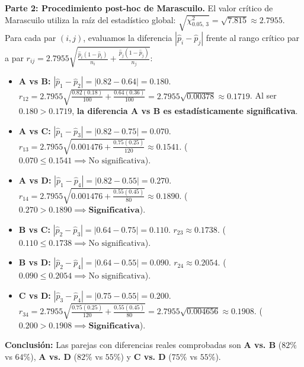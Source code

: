 \begin{solproblema}
	\textbf{Parte 2: Procedimiento post-hoc de Marascuilo.}
	El valor crítico de Marascuilo utiliza la raíz del estadístico global: $\sqrt{\chi^2_{0.05, \, 3}} = \sqrt{7.815} \approx 2.7955$.
	Para cada par $(i, j)$, evaluamos la diferencia $|\hat{p}_i - \hat{p}_j|$ frente al rango crítico par a par $r_{ij} = 2.7955 \sqrt{\frac{\hat{p}_i(1-\hat{p}_i)}{n_i} + \frac{\hat{p}_j(1-\hat{p}_j)}{n_j}}$:
	\begin{itemize}
		\item \textbf{A vs B:} $|\hat{p}_1 - \hat{p}_2| = |0.82 - 0.64| = 0.180$.
		$r_{12} = 2.7955 \sqrt{\frac{0.82(0.18)}{100} + \frac{0.64(0.36)}{100}} = 2.7955 \sqrt{0.00378} \approx 0.1719$.
		Al ser $0.180 > 0.1719$, \textbf{la diferencia A vs B es estadísticamente significativa}.
		\item \textbf{A vs C:} $|\hat{p}_1 - \hat{p}_3| = |0.82 - 0.75| = 0.070$.
		$r_{13} = 2.7955 \sqrt{0.001476 + \frac{0.75(0.25)}{120}} \approx 0.1541$. ($0.070 \le 0.1541 \implies \text{No significativa}$).
		\item \textbf{A vs D:} $|\hat{p}_1 - \hat{p}_4| = |0.82 - 0.55| = 0.270$.
		$r_{14} = 2.7955 \sqrt{0.001476 + \frac{0.55(0.45)}{80}} \approx 0.1890$. ($0.270 > 0.1890 \implies \textbf{Significativa}$).
		\item \textbf{B vs C:} $|\hat{p}_2 - \hat{p}_3| = |0.64 - 0.75| = 0.110$.
		$r_{23} \approx 0.1738$. ($0.110 \le 0.1738 \implies \text{No significativa}$).
		\item \textbf{B vs D:} $|\hat{p}_2 - \hat{p}_4| = |0.64 - 0.55| = 0.090$.
		$r_{24} \approx 0.2054$. ($0.090 \le 0.2054 \implies \text{No significativa}$).
		\item \textbf{C vs D:} $|\hat{p}_3 - \hat{p}_4| = |0.75 - 0.55| = 0.200$.
		$r_{34} = 2.7955 \sqrt{\frac{0.75(0.25)}{120} + \frac{0.55(0.45)}{80}} = 2.7955 \sqrt{0.004656} \approx 0.1908$. ($0.200 > 0.1908 \implies \textbf{Significativa}$).
	\end{itemize}
	\textbf{Conclusión:} Las parejas con diferencias reales comprobadas son \textbf{A vs. B} ($82\%$ vs $64\%$), \textbf{A vs. D} ($82\%$ vs $55\%$) y \textbf{C vs. D} ($75\%$ vs $55\%$).
\end{solproblema}

